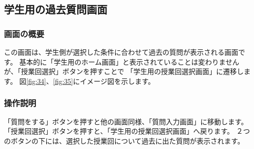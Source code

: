 \newpage

\subsection{学生用の過去質問画面}
\subsubsection{画面の概要}
この画面は、学生側が選択した条件に合わせて過去の質問が表示される画面です。
基本的に「学生用のホーム画面」と表示されていることは変わりませんが、「授業回選択」ボタンを押すことで
「学生用の授業回選択画面」に遷移します。
図\ref{fig:34}、\ref{fig:35}にイメージ図を示します。

\subsubsection{操作説明}
「質問をする」ボタンを押すと他の画面同様、「質問入力画面」に移動します。
「授業回選択」ボタンを押すと、「学生用の授業回選択画面」へ戻ります。
２つのボタンの下には、選択した授業回について過去に出た質問が表示されます。



